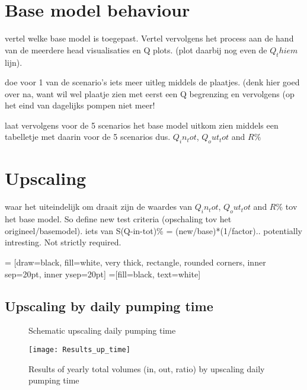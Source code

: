 \section{Base model behaviour}

vertel welke base model is toegepast. Vertel vervolgens het process aan de hand van de meerdere head visualisaties en Q plots. (plot daarbij nog even de $Q_thiem$ lijn). 

doe voor 1 van de scenario's iets meer uitleg middels de plaatjes. (denk hier goed over  na, want wil wel plaatje zien met eerst een Q begrenzing en vervolgens (op het eind van dagelijks pompen niet meer!

laat vervolgens voor de 5 scenarios het base model uitkom zien middels een tabelletje met daarin voor de 5 scenarios dus. $Q_in_tot$, $Q_out_tot$ and $R\%$


\section{Upscaling}
waar het uiteindelijk om draait zijn de waardes van $Q_in_tot$, $Q_out_tot$ and $R\%$ tov het base model. So define new test criteria (opschaling tov het origineel/basemodel). iets van S(Q-in-tot)\% = (new/base)*(1/factor).. potentially intresting. Not strictly required. 


 = [draw=black, fill=white, very thick,
    rectangle, rounded corners, inner sep=20pt, inner ysep=20pt]
 =[fill=black, text=white]

\subsection{Upscaling by daily pumping time}

\begin{figure}[h]
\centering
{}
\captionsetup{justification=centering}
\caption{Schematic upscaling daily pumping time}
\label{fig:Schematic_up_time}
\end{figure}

\begin{figure}[h!]
 \centering
 \texttt{[image: Results\_up\_time]}
 \captionsetup{justification=centering} 
 \caption{Results of yearly total volumes (in, out, ratio) by upscaling daily pumping time}
 \label{fig:Results_up_time}
\end{figure}

